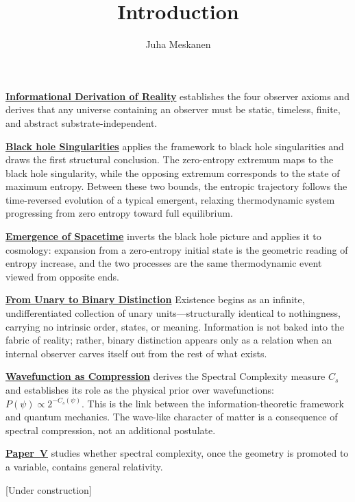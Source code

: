 \documentclass[11pt]{article}
\title{Introduction}
\author{Juha Meskanen}
\begin{document}
\maketitle

\textbf{\href{https://meskanen.com/abstract/informational-derivation-of-reality.pdf}{Informational Derivation of Reality}} establishes the four observer axioms and derives that
any universe containing an observer must be static, timeless, finite, and abstract substrate-independent. 

\textbf{\href{https://meskanen.com/abstract/black-hole-singularities.pdf}{Black hole Singularities}} applies the framework to black hole singularities and
draws the first structural conclusion. The zero-entropy extremum maps to the black hole singularity,
while the opposing extremum corresponds to the state of maximum entropy.
Between these two bounds, the entropic trajectory follows the time-reversed evolution of a typical emergent, relaxing thermodynamic
system progressing from zero entropy toward full equilibrium.

\textbf{\href{https://meskanen.com/abstract/emergence-of-spacetime.pdf}{Emergence of Spacetime}} inverts the black hole picture and applies it to
cosmology: expansion from a zero-entropy initial state is the geometric reading of entropy increase, and the two processes are the same
thermodynamic event viewed from opposite ends.

\textbf{\href{https://meskanen.com/abstract/unary-hypothesis.pdf}{From Unary to Binary Distinction}} Existence begins as an infinite,
undifferentiated collection of unary units—structurally identical to nothingness, carrying no intrinsic order, states, or meaning.
Information is not baked into the fabric of reality; rather, binary distinction appears only as a relation when an internal observer carves itself out from the rest of what exists.

\textbf{\href{https://meskanen.com/abstract/wavefunction-as-compression.pdf}{Wavefunction as Compression}} derives the Spectral Complexity measure $C_s$ and
establishes its role as the physical prior over wavefunctions:
$P(\psi) \propto 2^{-C_s(\psi)}$. This is the link between the
information-theoretic framework and quantum mechanics. The wave-like
character of matter is a consequence of spectral compression, not an
additional postulate.

\textbf{\href{https://meskanen.com/abstract/spectral-compression-gravity.pdf}{Paper~V}} studies 
whether spectral complexity, once the geometry is promoted to a variable, contains general relativity. 

[Under construction]

\printbibliography
\end{document}
